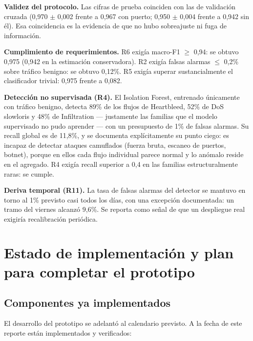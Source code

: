 \documentclass[11pt,a4paper]{article}
\begin{document}
\noindent\textbf{Validez del protocolo.} Las cifras de prueba coinciden con
las de validación cruzada (0,970 $\pm$ 0,002 frente a 0,967 con puerto;
0,950 $\pm$ 0,004 frente a 0,942 sin él). Esa coincidencia es la evidencia de
que no hubo sobreajuste ni fuga de información.

\noindent\textbf{Cumplimiento de requerimientos.} R6 exigía macro-F1
$\geq$ 0,94: se obtuvo 0,975 (0,942 en la estimación conservadora). R2 exigía
falsas alarmas $\leq$ 0,2\% sobre tráfico benigno: se obtuvo 0,12\%. R5
exigía superar sustancialmente el clasificador trivial: 0,975 frente a 0,082.

\noindent\textbf{Detección no supervisada (R4).} El Isolation Forest,
entrenado únicamente con tráfico benigno, detecta 89\% de los flujos de
Heartbleed, 52\% de DoS slowloris y 48\% de Infiltration --- justamente las
familias que el modelo supervisado no pudo aprender --- con un presupuesto de
1\% de falsas alarmas. Su recall global es de 11,8\%, y se documenta
explícitamente su punto ciego: es incapaz de detectar ataques camuflados
(fuerza bruta, escaneo de puertos, botnet), porque en ellos cada flujo
individual parece normal y lo anómalo reside en el agregado. R4 exigía recall
superior a 0,4 en las familias estructuralmente raras: se cumple.

\noindent\textbf{Deriva temporal (R11).} La tasa de falsas alarmas del
detector se mantuvo en torno al 1\% previsto casi todos los días, con una
excepción documentada: un tramo del viernes alcanzó 9,6\%. Se reporta como
señal de que un despliegue real exigiría recalibración periódica.

\section{Estado de implementación y plan para completar el prototipo}
\label{sec:plan}

\subsection{Componentes ya implementados}

El desarrollo del prototipo se adelantó al calendario previsto. A la fecha de
este reporte están implementados y verificados:
\end{document}
